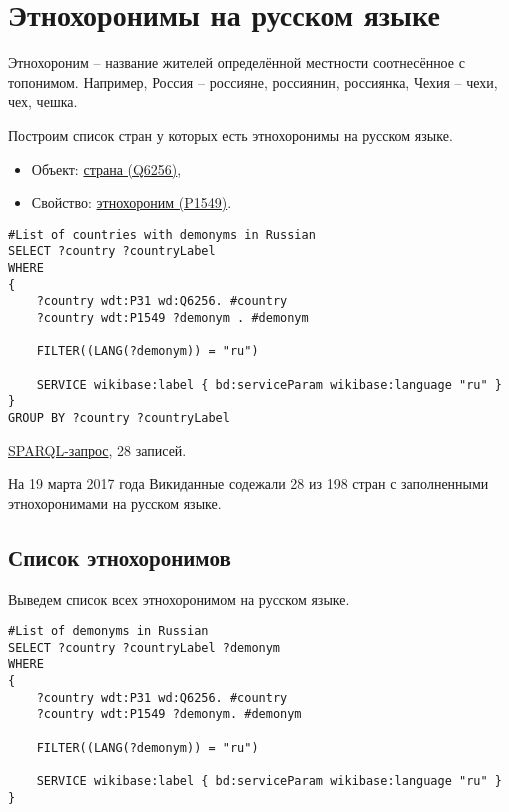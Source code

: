 \section{Этнохоронимы на русском языке}
Этнохороним -- название жителей определённой местности соотнесённое с топонимом. Например, Россия -- россияне, россиянин, россиянка, Чехия -- чехи, чех, чешка.

Построим список стран у которых есть этнохоронимы на русском языке.

\begin{itemize}
\item Объект: \href{https://www.wikidata.org/wiki/Q6256}{страна (Q6256)},
\item Свойство: \href{https://www.wikidata.org/wiki/Property:P1549}{этнохороним (P1549)}.
\end{itemize}

\begin{lstlisting}[language=SPARQL label=countrydemonyms, caption=Список стран с этнохоронимами на русском языке]
#List of countries with demonyms in Russian
SELECT ?country ?countryLabel 
WHERE
{
    ?country wdt:P31 wd:Q6256. #country
    ?country wdt:P1549 ?demonym . #demonym
    
    FILTER((LANG(?demonym)) = "ru")
    
    SERVICE wikibase:label { bd:serviceParam wikibase:language "ru" }
}
GROUP BY ?country ?countryLabel
\end{lstlisting}

\href{https://query.wikidata.org/#%23List%20of%20countries%20with%20demonyms%20in%20Russian%0ASELECT%20%3Fcountry%20%3FcountryLabel%20%0AWHERE%0A%7B%0A%09%3Fcountry%20wdt%3AP31%20wd%3AQ6256.%20%20%20%20%20%20%20%23country%0A%09%3Fcountry%20wdt%3AP1549%20%3Fdemonym%20.%20%20%20%20%23demonym%0A%09FILTER%28%28LANG%28%3Fdemonym%29%29%20%3D%20%22ru%22%29%0A%09SERVICE%20wikibase%3Alabel%20%7B%20bd%3AserviceParam%20wikibase%3Alanguage%20%22ru%22%20%7D%0A%7D%0A%0AGROUP%20BY%20%3Fcountry%20%3FcountryLabel}{SPARQL-запрос}, 28 записей.

На 19 марта 2017 года Викиданные содежали 28 из 198 стран с заполненными этнохоронимами на русском языке.

\subsection{Список этнохоронимов}

Выведем список всех этнохоронимом на русском языке.
\begin{lstlisting}[language=SPARQL label=listdemonym, caption=Список этнохоронимов на русском языке]
#List of demonyms in Russian
SELECT ?country ?countryLabel ?demonym
WHERE
{
    ?country wdt:P31 wd:Q6256. #country
    ?country wdt:P1549 ?demonym. #demonym
    
    FILTER((LANG(?demonym)) = "ru")
    
    SERVICE wikibase:label { bd:serviceParam wikibase:language "ru" }
}
\end{lstlisting}

